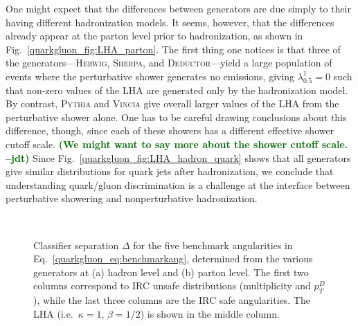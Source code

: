 \documentclass[11pt]{cernrep}
\newcommand{\jdt}[1]{\textbf{\textcolor{darkgreen}{(#1 --jdt)}}}
\begin{document}
One might expect that the differences between generators are due
simply to their having different hadronization models.  It seems,
however, that the differences already appear at the parton level prior
to hadronization, as shown in Fig.~\ref{quarkgluon_fig:LHA_parton}.
The first thing one notices is that three of the
generators---\textsc{Herwig}, \textsc{Sherpa}, and
\textsc{Deductor}---yield a large population of events where the
perturbative shower generates no emissions, giving
$\lambda_{0.5}^1 = 0$ such that non-zero values of the LHA are
generated only by the hadronization model.  By contrast,
\textsc{Pythia} and \textsc{Vincia} give overall larger values of the
LHA from the perturbative shower alone.  One has to be careful drawing conclusions about this difference, though, since each of these showers has a different effective shower cutoff scale.  \jdt{We might want to say more about the shower cutoff scale.}  Since Fig.~\ref{quarkgluon_fig:LHA_hadron_quark} shows that all generators
give similar distributions for quark jets after hadronization, we
conclude that understanding quark/gluon discrimination is a challenge
at the interface between perturbative showering and nonperturbative
hadronization.

\begin{figure}
\centering
{}
$\qquad$
\caption{Classifier separation $\Delta$ for the five benchmark angularities in Eq.~\eqref{quarkgluon_eq:benchmarkang}, determined from the various generators at (a) hadron level and (b) parton level.  The first two columns correspond to IRC unsafe distributions (multiplicity and $p_T^D$), while the last three columns are the IRC safe angularities.  The LHA (i.e.~$\kappa = 1$, $\beta = 1/2$) is shown in the middle column.}
\label{quarkgluon_fig:summary_all}
\end{figure}
\end{document}
